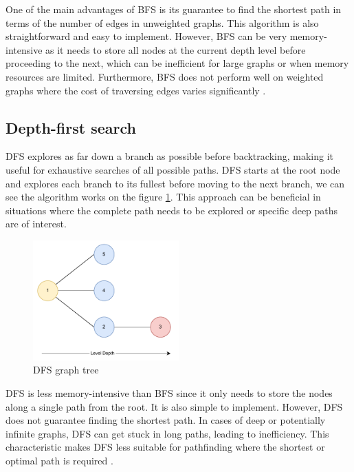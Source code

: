 \documentclass[12pt]{report}
\begin{document}
        One of the main advantages of BFS is its guarantee to find the shortest path in terms of the number of edges in
        unweighted graphs. This algorithm is also straightforward and easy to implement. However, BFS can be very
        memory-intensive as it needs to store all nodes at the current depth level before proceeding to the next, which
        can be inefficient for large graphs or when memory resources are limited. Furthermore, BFS does not perform well
        on weighted graphs where the cost of traversing edges varies significantly \cite{cormen_introduction_2022}.

        \subsection{Depth-first search} 
        \ac{DFS} explores as far down a branch as possible before backtracking, making it useful for exhaustive searches
        of all possible paths. DFS starts at the root node and explores each branch to its fullest before moving to the
        next branch, we can see the algorithm works on the figure \ref{fig:dfs}. This approach can be beneficial in
        situations where the complete path needs to be explored or specific deep paths are of interest.

        \begin{figure}[H]
            \centering
            \includegraphics[width=0.5\textwidth]{General Image/OSM Drone-DFS.pdf}
            \caption{DFS graph tree}
            \label{fig:dfs}
        \end{figure}

        DFS is less memory-intensive than BFS since it only needs to store the nodes along a single path from the root.
        It is also simple to implement. However, DFS does not guarantee finding the shortest path. In cases of deep or
        potentially infinite graphs, DFS can get stuck in long paths, leading to inefficiency. This characteristic makes
        DFS less suitable for pathfinding where the shortest or optimal path is required \cite{knuth_art_1997}.
\end{document}
